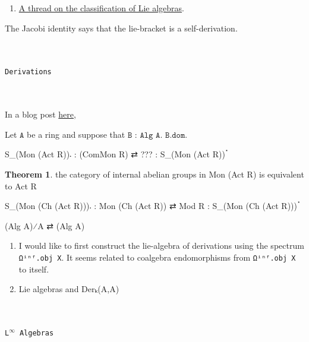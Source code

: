 \documentclass{book}
\theoremstyle{definition}
\newtheorem{theorem}{Theorem}
\renewcommand{\chapter}[1]{
\newpage
{
\Huge 
\begin{center}
\ \\
\ \\
\thispagestyle{empty}
\texttt{#1}
\end{center}}
\ \\
\ \\
}
\begin{document}
\begin{enumerate}
\item \href{https://leanprover.zulipchat.com/#narrow/stream/287929-mathlib4/topic/The.20classification.20of.20Lie.20algebras}{A thread on the classification of Lie algebras}.
\end{enumerate}

The Jacobi identity says that the lie-bracket is a self-derivation.\\



\newpage
\chapter{Derivations}

In a blog post \href{https://amathew.wordpress.com/2011/05/14/the-cotangent-complex-i-group-objects-in-categories-of-algebras/}{here},



Let $\texttt{A}$ be a ring and suppose that $\texttt{B : Alg A}$. $\texttt{B.dom}$.\\

\begin{center}
S\_(Mon (Act R))𛲔 : (ComMon R) ⇄ ??? : S\_(Mon (Act R))ॱ
\end{center}

\begin{theorem}the category of internal abelian groups in Mon (Act R) is equivalent to Act R
\end{theorem}

\begin{center}
S\_(Mon (Ch (Act R)))𛲔 : Mon (Ch (Act R)) ⇄ Mod R : S\_(Mon (Ch (Act R)))ॱ
\end{center}


\begin{center}
(Alg A)⁄A ⇄ (Alg A)
\end{center}


\begin{enumerate}
\item I would like to first construct the lie-algebra of derivations using the spectrum \texttt{Ωⁱⁿᶠ.obj X}. It seems related to coalgebra endomorphisms from \texttt{Ωⁱⁿᶠ.obj X} to itself.
\item Lie algebras and Derₖ(A,A)
\end{enumerate}


\newpage
\chapter{L${}^{\infty}$ Algebras}
\end{document}
